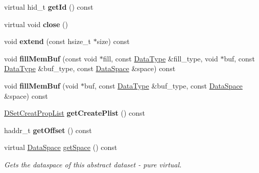 \begin{DoxyCompactItemize}
virtual hid\+\_\+t {\bfseries get\+Id} () const
\item 
\mbox{\label{class_h5_1_1_data_set_a3c8817b1aaccdc7321613c72450f4c25}} 
virtual void {\bfseries close} ()
\item 
\mbox{\label{class_h5_1_1_data_set_afc129e130931208e583f5365fd1b8adf}} 
void {\bfseries extend} (const hsize\+\_\+t $\ast$size) const
\item 
\mbox{\label{class_h5_1_1_data_set_a5756e19990bd92d8330dd3c0a103e320}} 
void {\bfseries fill\+Mem\+Buf} (const void $\ast$fill, const \hyperlink{class_h5_1_1_data_type}{Data\+Type} \&fill\+\_\+type, void $\ast$buf, const \hyperlink{class_h5_1_1_data_type}{Data\+Type} \&buf\+\_\+type, const \hyperlink{class_h5_1_1_data_space}{Data\+Space} \&space) const
\item 
\mbox{\label{class_h5_1_1_data_set_a2b392d2501798805244b70cccd600616}} 
void {\bfseries fill\+Mem\+Buf} (void $\ast$buf, const \hyperlink{class_h5_1_1_data_type}{Data\+Type} \&buf\+\_\+type, const \hyperlink{class_h5_1_1_data_space}{Data\+Space} \&space) const
\item 
\mbox{\label{class_h5_1_1_data_set_af26b765feecf061bf298fe2466965947}} 
\hyperlink{class_h5_1_1_d_set_creat_prop_list}{D\+Set\+Creat\+Prop\+List} {\bfseries get\+Create\+Plist} () const
\item 
\mbox{\label{class_h5_1_1_data_set_a42306b281362c49c530e4f6f597d25a8}} 
haddr\+\_\+t {\bfseries get\+Offset} () const
\item 
\mbox{\label{class_h5_1_1_data_set_a49745208bc198e9869b48fc678dbde67}} 
virtual \hyperlink{class_h5_1_1_data_space}{Data\+Space} \hyperlink{class_h5_1_1_data_set_a49745208bc198e9869b48fc678dbde67}{get\+Space} () const
\begin{DoxyCompactList}\small\item\em Gets the dataspace of this abstract dataset -\/ pure virtual. \end{DoxyCompactList}\item 
\mbox{\label{class_h5_1_1_data_set_a958910ebece0c91ea715fa39bad09968}} 

\end{DoxyCompactItemize}
